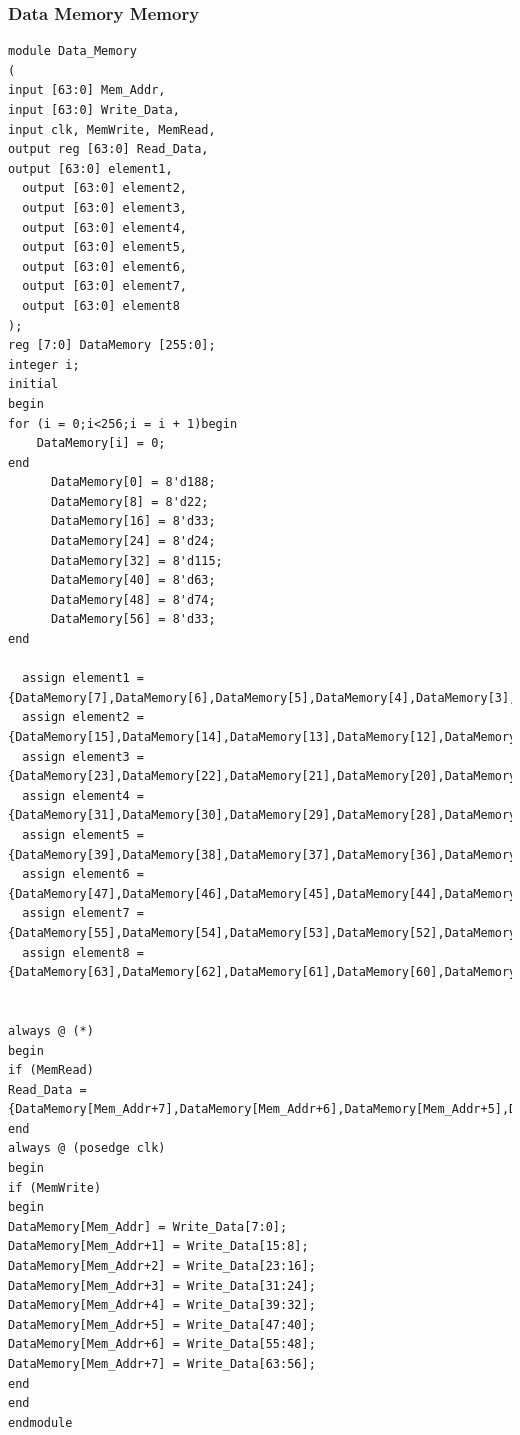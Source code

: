 \documentclass{article}
\begin{document}
\subsubsection{Data Memory Memory}
\begin{lstlisting}[caption={Design Module for Data Memory}, captionpos=b, language=RISC-V]
module Data_Memory
(
input [63:0] Mem_Addr,
input [63:0] Write_Data,
input clk, MemWrite, MemRead,
output reg [63:0] Read_Data,
output [63:0] element1,
  output [63:0] element2,
  output [63:0] element3,
  output [63:0] element4,
  output [63:0] element5,
  output [63:0] element6,
  output [63:0] element7,
  output [63:0] element8
);
reg [7:0] DataMemory [255:0];
integer i;
initial
begin
for (i = 0;i<256;i = i + 1)begin
    DataMemory[i] = 0;
end
      DataMemory[0] = 8'd188;
      DataMemory[8] = 8'd22;
      DataMemory[16] = 8'd33;
      DataMemory[24] = 8'd24;
      DataMemory[32] = 8'd115;
      DataMemory[40] = 8'd63;
      DataMemory[48] = 8'd74;
      DataMemory[56] = 8'd33;
end

  assign element1 = {DataMemory[7],DataMemory[6],DataMemory[5],DataMemory[4],DataMemory[3],DataMemory[2],DataMemory[1],DataMemory[0]};
  assign element2 = {DataMemory[15],DataMemory[14],DataMemory[13],DataMemory[12],DataMemory[11],DataMemory[10],DataMemory[9],DataMemory[8]};
  assign element3 = {DataMemory[23],DataMemory[22],DataMemory[21],DataMemory[20],DataMemory[19],DataMemory[18],DataMemory[17],DataMemory[16]};
  assign element4 = {DataMemory[31],DataMemory[30],DataMemory[29],DataMemory[28],DataMemory[27],DataMemory[26],DataMemory[25],DataMemory[24]};
  assign element5 = {DataMemory[39],DataMemory[38],DataMemory[37],DataMemory[36],DataMemory[35],DataMemory[34],DataMemory[33],DataMemory[32]};
  assign element6 = {DataMemory[47],DataMemory[46],DataMemory[45],DataMemory[44],DataMemory[43],DataMemory[42],DataMemory[41],DataMemory[40]};
  assign element7 = {DataMemory[55],DataMemory[54],DataMemory[53],DataMemory[52],DataMemory[51],DataMemory[50],DataMemory[49],DataMemory[48]};
  assign element8 = {DataMemory[63],DataMemory[62],DataMemory[61],DataMemory[60],DataMemory[59],DataMemory[58],DataMemory[57],DataMemory[56]};


always @ (*)
begin
if (MemRead)
Read_Data =
{DataMemory[Mem_Addr+7],DataMemory[Mem_Addr+6],DataMemory[Mem_Addr+5],DataMemory[Mem_Addr+4],DataMemory[Mem_Addr+3],DataMemory[Mem_Addr+2],DataMemory[Mem_Addr+1],DataMemory[Mem_Addr]};
end
always @ (posedge clk)
begin
if (MemWrite)
begin
DataMemory[Mem_Addr] = Write_Data[7:0];
DataMemory[Mem_Addr+1] = Write_Data[15:8];
DataMemory[Mem_Addr+2] = Write_Data[23:16];
DataMemory[Mem_Addr+3] = Write_Data[31:24];
DataMemory[Mem_Addr+4] = Write_Data[39:32];
DataMemory[Mem_Addr+5] = Write_Data[47:40];
DataMemory[Mem_Addr+6] = Write_Data[55:48];
DataMemory[Mem_Addr+7] = Write_Data[63:56];
end
end
endmodule
\end{lstlisting}
\end{document}
